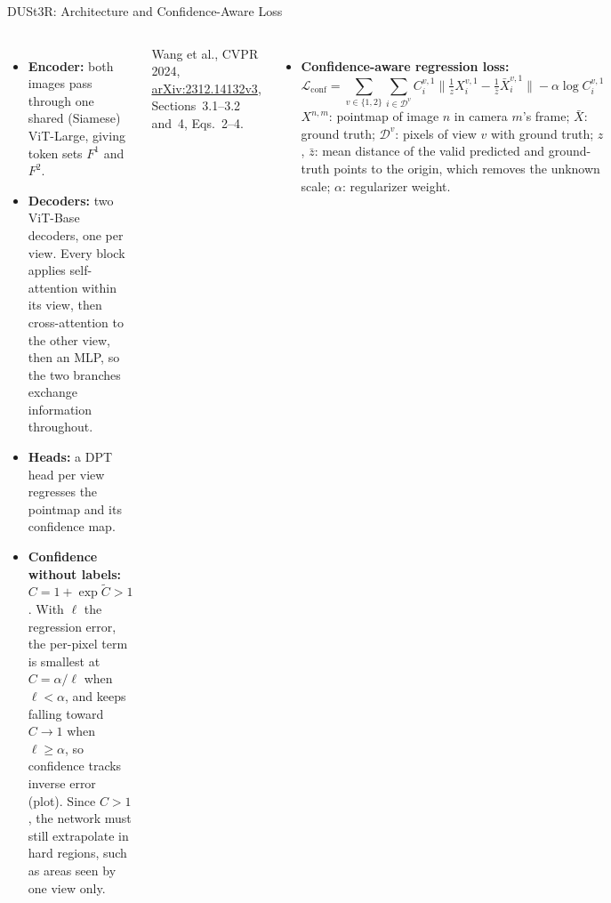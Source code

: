 \begin{frame}{DUSt3R: Architecture and Confidence-Aware Loss}
  \begin{columns}[T,onlytextwidth]
      \begin{itemize}\footnotesize\itemsep0.3em
        \item \textbf{Encoder:} both images pass through one shared (Siamese) ViT-Large, giving token sets $F^1$ and $F^2$.
        \item \textbf{Decoders:} two ViT-Base decoders, one per view. Every block applies self-attention within its view, then cross-attention to the other view, then an MLP, so the two branches exchange information throughout.
        \item \textbf{Heads:} a DPT head per view regresses the pointmap and its confidence map.
        \item \textbf{Confidence without labels:} $C = 1+\exp\tilde{C} > 1$. With $\ell$ the regression error, the per-pixel term is smallest at $C=\alpha/\ell$ when $\ell<\alpha$, and keeps falling toward $C\to1$ when $\ell\geq\alpha$, so confidence tracks inverse error (plot). Since $C>1$, the network must still extrapolate in hard regions, such as areas seen by one view only.
      \end{itemize}
      \vspace{0.2em}
      {\scriptsize Wang et al., CVPR 2024, \href{https://arxiv.org/abs/2312.14132v3}{arXiv:2312.14132v3}, Sections~3.1--3.2 and~4, Eqs.~2--4.\par}
      \begin{itemize}\footnotesize\itemsep0.3em
        \setlength{\abovedisplayskip}{3pt}\setlength{\belowdisplayskip}{3pt}
        \item \textbf{Confidence-aware regression loss:}
        \[ \mathcal{L}_{\text{conf}} = \sum_{v\in\{1,2\}} \sum_{i\in\mathcal{D}^v} C_i^{v,1}\Big\lVert \tfrac{1}{z}X_i^{v,1} - \tfrac{1}{\bar{z}}\bar{X}_i^{v,1}\Big\rVert - \alpha\log C_i^{v,1} \]
        $X^{n,m}$: pointmap of image $n$ in camera $m$'s frame; $\bar{X}$: ground truth; $\mathcal{D}^v$: pixels of view $v$ with ground truth; $z$, $\bar{z}$: mean distance of the valid predicted and ground-truth points to the origin, which removes the unknown scale; $\alpha$: regularizer weight.
      \end{itemize}
      \vspace{0.2em}
      \centering

\end{columns}
\end{frame}
